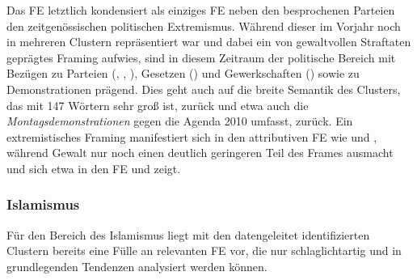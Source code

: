 Das FE  letztlich kondensiert als einziges FE neben den besprochenen Parteien den zeitgenössischen politischen Extremismus. Während dieser im Vorjahr noch in mehreren Clustern repräsentiert war und dabei ein von gewaltvollen Straftaten geprägtes Framing aufwies, sind in diesem Zeitraum der politische Bereich mit Bezügen zu Parteien (, , ), Gesetzen () und Gewerkschaften () sowie zu Demonstrationen prägend. Dies geht auch auf die breite Semantik des Clusters, das mit 147 Wörtern sehr groß ist, zurück und etwa auch die \emph{Montagsdemonstrationen} gegen die Agenda 2010 umfasst, zurück. Ein extremistisches Framing manifestiert sich in den attributiven FE wie  und , während Gewalt nur noch einen deutlich geringeren Teil des Frames ausmacht und sich etwa in den FE  und  zeigt.

\subsubsection{Islamismus}\label{islamismus-1}

Für den Bereich des Islamismus liegt mit den datengeleitet identifizierten Clustern bereits eine Fülle an relevanten FE vor, die nur schlaglichtartig und in grundlegenden Tendenzen analysiert werden können.

